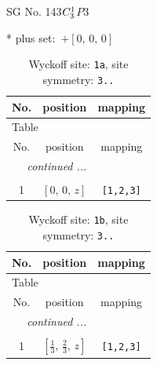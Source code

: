\documentclass[fleqn,8pt]{jsarticle}
\begin{document}
\setcounter{MaxMatrixCols}{32}

\renewcommand{\tablename}{Table~}
\renewcommand{\figurename}{Figure~}
\begin{center}
\LARGE
SG No. 143\quad$C_{\rm 3}^{1}$\quad$P3$\quad[ trigonal ]
\end{center}
* plus set:\,\,\,$+\left[ 0,\, 0,\, 0 \right]$
\renewcommand{\arraystretch}{1.2}
\begin{longtable}{ccc}
\caption{Wyckoff site: {\tt 1a}, site symmetry: {\tt 3..}}
 \\
 \hline \hline
No. & position & mapping \\ \hline \endfirsthead

\multicolumn{2}{l}{\tablename\ \thetable{}} \\
 \hline \hline
No. & position & mapping \\ \hline \endhead

 \hline \hline
\multicolumn{2}{r}{\footnotesize\it continued ...} \\ \endfoot

 \hline \hline
\multicolumn{2}{r}{} \\ \endlastfoot

1 & $\left[ 0,\, 0,\, z \right]$ & {\tt [1,2,3]} \\
\end{longtable}
\renewcommand{\arraystretch}{1.2}
\begin{longtable}{ccc}
\caption{Wyckoff site: {\tt 1b}, site symmetry: {\tt 3..}}
 \\
 \hline \hline
No. & position & mapping \\ \hline \endfirsthead

\multicolumn{2}{l}{\tablename\ \thetable{}} \\
 \hline \hline
No. & position & mapping \\ \hline \endhead

 \hline \hline
\multicolumn{2}{r}{\footnotesize\it continued ...} \\ \endfoot

 \hline \hline
\multicolumn{2}{r}{} \\ \endlastfoot

1 & $\left[ \frac{1}{3},\, \frac{2}{3},\, z \right]$ & {\tt [1,2,3]} \\
\end{longtable}
\renewcommand{\arraystretch}{1.2}
\end{document}
